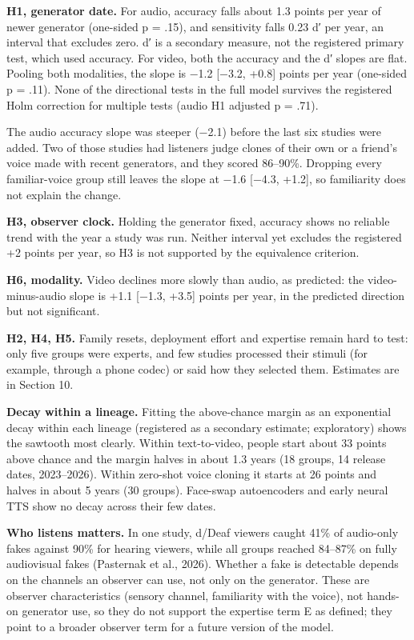 \documentclass[11pt]{article}
\begin{document}
\textbf{H1, generator date.} For audio, accuracy falls about 1.3 points
per year of newer generator (one-sided p = .15), and sensitivity falls
0.23 d′ per year, an interval that excludes zero. d′ is a secondary
measure, not the registered primary test, which used accuracy. For
video, both the accuracy and the d′ slopes are flat. Pooling both
modalities, the slope is −1.2 {[}−3.2, +0.8{]} points per year
(one-sided p = .11). None of the directional tests in the full model
survives the registered Holm correction for multiple tests (audio H1
adjusted p = .71).

The audio accuracy slope was steeper (−2.1) before the last six studies
were added. Two of those studies had listeners judge clones of their own
or a friend's voice made with recent generators, and they scored
86--90\%. Dropping every familiar-voice group still leaves the slope at
−1.6 {[}−4.3, +1.2{]}, so familiarity does not explain the change.

\textbf{H3, observer clock.} Holding the generator fixed, accuracy shows
no reliable trend with the year a study was run. Neither interval yet
excludes the registered +2 points per year, so H3 is not supported by
the equivalence criterion.

\textbf{H6, modality.} Video declines more slowly than audio, as
predicted: the video-minus-audio slope is +1.1 {[}−1.3, +3.5{]} points
per year, in the predicted direction but not significant.

\textbf{H2, H4, H5.} Family resets, deployment effort and expertise
remain hard to test: only five groups were experts, and few studies
processed their stimuli (for example, through a phone codec) or said how
they selected them. Estimates are in Section 10.

\textbf{Decay within a lineage.} Fitting the above-chance margin as an
exponential decay within each lineage (registered as a secondary
estimate; exploratory) shows the sawtooth most clearly. Within
text-to-video, people start about 33 points above chance and the margin
halves in about 1.3 years (18 groups, 14 release dates, 2023--2026).
Within zero-shot voice cloning it starts at 26 points and halves in
about 5 years (30 groups). Face-swap autoencoders and early neural TTS
show no decay across their few dates.

\textbf{Who listens matters.} In one study, d/Deaf viewers caught 41\%
of audio-only fakes against 90\% for hearing viewers, while all groups
reached 84--87\% on fully audiovisual fakes (Pasternak et al., 2026).
Whether a fake is detectable depends on the channels an observer can
use, not only on the generator. These are observer characteristics
(sensory channel, familiarity with the voice), not hands-on generator
use, so they do not support the expertise term E as defined; they point
to a broader observer term for a future version of the model.
\end{document}
